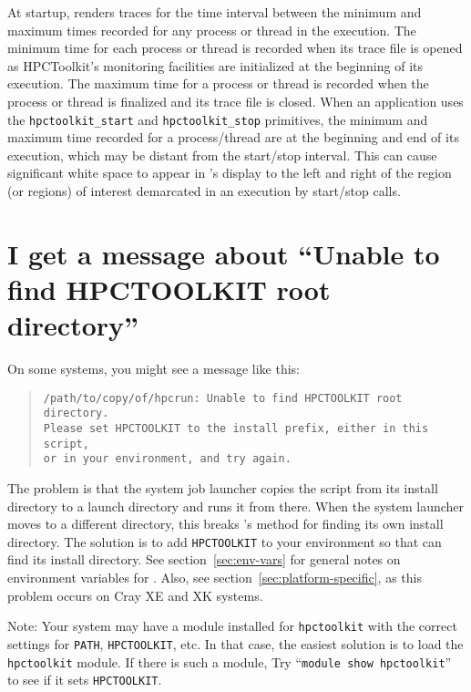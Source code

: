\documentclass[11pt,letterpaper]{report}
\begin{document}
At startup, \hpctraceviewer{}  renders traces for the time interval between the minimum and maximum times recorded for any process or thread in the execution. The minimum time for each process or thread is recorded when its trace file is opened as HPCToolkit's monitoring facilities are initialized at the beginning of its execution. The maximum time for a process or thread is recorded when the process or thread is finalized and its trace file is closed. When an application uses the \verb|hpctoolkit_start| and \verb|hpctoolkit_stop| primitives, the minimum and maximum time recorded for a process/thread are  at the beginning and end of its execution, which may be  distant from the start/stop interval. This can cause significant white space to appear in \hpctraceviewer{}'s display to the left and right of the region (or regions) of interest demarcated in an execution by start/stop calls.


\section{I get a message about ``Unable to find HPCTOOLKIT root directory''}

On some systems, you might see a message like this:
\begin{quote}
\begin{verbatim}
/path/to/copy/of/hpcrun: Unable to find HPCTOOLKIT root directory.
Please set HPCTOOLKIT to the install prefix, either in this script,
or in your environment, and try again.
\end{verbatim}
\end{quote}


The problem is that the system job launcher copies the \hpcrun{}
script from its install directory to a launch directory and runs
it from there.  When the system launcher moves \hpcrun{} to a different directory, this
breaks \hpcrun{}'s method for finding its own install directory.
The solution is to add \verb|HPCTOOLKIT| to your environment so that
\hpcrun{} can find its install directory. See section~\ref{sec:env-vars} for
general notes on environment variables for \hpcrun{}. Also, see section~\ref{sec:platform-specific},
as this problem occurs on Cray XE and XK systems.

Note: Your system may have a module installed for \verb|hpctoolkit| with the
correct settings for \verb|PATH|, \verb|HPCTOOLKIT|, etc.  In that case,
the easiest solution is to load the \verb|hpctoolkit| module.  If there is
such a module, Try
``\verb|module show hpctoolkit|'' to see if it sets \verb|HPCTOOLKIT|.
\end{document}
